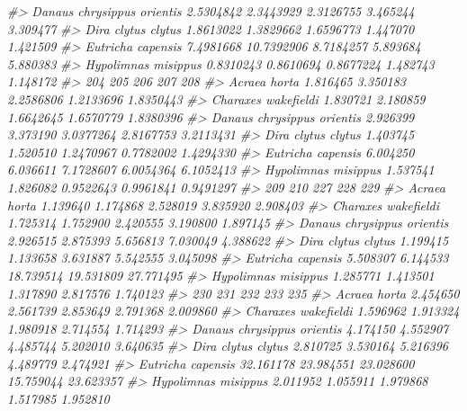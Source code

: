 \documentclass[
]{article}
\newenvironment{Shaded}{\begin{snugshade}}{\end{snugshade}}
\newcommand{\CommentTok}[1]{\textcolor[rgb]{0.56,0.35,0.01}{\textit{#1}}}
\begin{document}
\begin{Shaded}
\begin{Highlighting}[]
\CommentTok{\#\textgreater{} Danaus chrysippus orientis 2.5304842  2.3443929 2.3126755 3.465244 3.309477}
\CommentTok{\#\textgreater{} Dira clytus clytus         1.8613022  1.3829662 1.6596773 1.447070 1.421509}
\CommentTok{\#\textgreater{} Eutricha capensis          7.4981668 10.7392906 8.7184257 5.893684 5.880383}
\CommentTok{\#\textgreater{} Hypolimnas misippus        0.8310243  0.8610694 0.8677224 1.482743 1.148172}
\CommentTok{\#\textgreater{}                                 204      205       206       207       208}
\CommentTok{\#\textgreater{} Acraea horta               1.816465 3.350183 2.2586806 1.2133696 1.8350443}
\CommentTok{\#\textgreater{} Charaxes wakefieldi        1.830721 2.180859 1.6642645 1.6570779 1.8380396}
\CommentTok{\#\textgreater{} Danaus chrysippus orientis 2.926399 3.373190 3.0377264 2.8167753 3.2113431}
\CommentTok{\#\textgreater{} Dira clytus clytus         1.403745 1.520510 1.2470967 0.7782002 1.4294330}
\CommentTok{\#\textgreater{} Eutricha capensis          6.004250 6.036611 7.1728607 6.0054364 6.1052413}
\CommentTok{\#\textgreater{} Hypolimnas misippus        1.537541 1.826082 0.9522643 0.9961841 0.9491297}
\CommentTok{\#\textgreater{}                                 209      210       227       228       229}
\CommentTok{\#\textgreater{} Acraea horta               1.139640 1.174868  2.528019  3.835920  2.908403}
\CommentTok{\#\textgreater{} Charaxes wakefieldi        1.725314 1.752900  2.420555  3.190800  1.897145}
\CommentTok{\#\textgreater{} Danaus chrysippus orientis 2.926515 2.875393  5.656813  7.030049  4.388622}
\CommentTok{\#\textgreater{} Dira clytus clytus         1.199415 1.133658  3.631887  5.542555  3.045098}
\CommentTok{\#\textgreater{} Eutricha capensis          5.508307 6.144533 18.739514 19.531809 27.771495}
\CommentTok{\#\textgreater{} Hypolimnas misippus        1.285771 1.413501  1.317890  2.817576  1.740123}
\CommentTok{\#\textgreater{}                                  230       231       232       233       235}
\CommentTok{\#\textgreater{} Acraea horta                2.454650  2.561739  2.853649  2.791368  2.009860}
\CommentTok{\#\textgreater{} Charaxes wakefieldi         1.596962  1.913324  1.980918  2.714554  1.714293}
\CommentTok{\#\textgreater{} Danaus chrysippus orientis  4.174150  4.552907  4.485744  5.202010  3.640635}
\CommentTok{\#\textgreater{} Dira clytus clytus          2.810725  3.530164  5.216396  4.489779  2.474921}
\CommentTok{\#\textgreater{} Eutricha capensis          32.161178 23.984551 23.028600 15.759044 23.623357}
\CommentTok{\#\textgreater{} Hypolimnas misippus         2.011952  1.055911  1.979868  1.517985  1.952810}

\end{Highlighting}
\end{Shaded}
\end{document}
